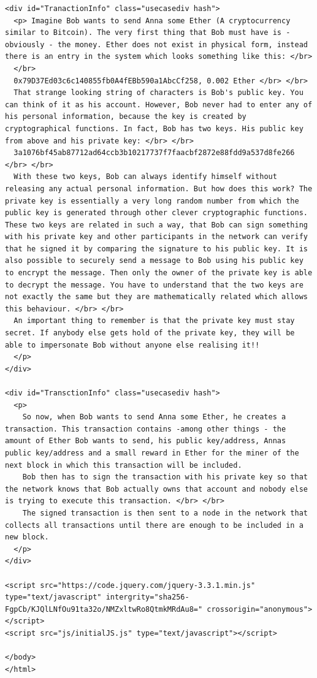 \begin{lstlisting}
<div id="TranactionInfo" class="usecasediv hash">
  <p> Imagine Bob wants to send Anna some Ether (A cryptocurrency similar to Bitcoin). The very first thing that Bob must have is - obviously - the money. Ether does not exist in physical form, instead there is an entry in the system which looks something like this: </br>
  </br>
  0x79D37Ed03c6c140855fb0A4fEBb590a1AbcCf258, 0.002 Ether </br> </br>
  That strange looking string of characters is Bob's public key. You can think of it as his account. However, Bob never had to enter any of his personal information, because the key is created by cryptographical functions. In fact, Bob has two keys. His public key from above and his private key: </br> </br>
  3a1076bf45ab87712ad64ccb3b10217737f7faacbf2872e88fdd9a537d8fe266 </br> </br>
  With these two keys, Bob can always identify himself without releasing any actual personal information. But how does this work? The private key is essentially a very long random number from which the public key is generated through other clever cryptographic functions. These two keys are related in such a way, that Bob can sign something with his private key and other participants in the network can verify that he signed it by comparing the signature to his public key. It is also possible to securely send a message to Bob using his public key to encrypt the message. Then only the owner of the private key is able to decrypt the message. You have to understand that the two keys are not exactly the same but they are mathematically related which allows this behaviour. </br> </br>
  An important thing to remember is that the private key must stay secret. If anybody else gets hold of the private key, they will be able to impersonate Bob without anyone else realising it!!
  </p>
</div>

<div id="TransctionInfo" class="usecasediv hash">
  <p>
    So now, when Bob wants to send Anna some Ether, he creates a transaction. This transaction contains -among other things - the amount of Ether Bob wants to send, his public key/address, Annas public key/address and a small reward in Ether for the miner of the next block in which this transaction will be included.
    Bob then has to sign the transaction with his private key so that the network knows that Bob actually owns that account and nobody else is trying to execute this transaction. </br> </br>
    The signed transaction is then sent to a node in the network that collects all transactions until there are enough to be included in a new block.
  </p>
</div>

<script src="https://code.jquery.com/jquery-3.3.1.min.js" type="text/javascript" intergrity="sha256-FgpCb/KJQlLNfOu91ta32o/NMZxltwRo8QtmkMRdAu8=" crossorigin="anonymous"></script>
<script src="js/initialJS.js" type="text/javascript"></script>

</body>
</html>

\end{lstlisting}

